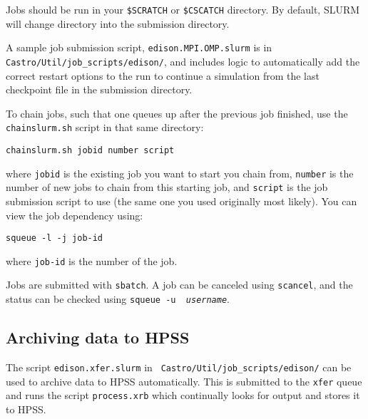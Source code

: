 Jobs should be run in your {\tt \$SCRATCH} or {\tt \$CSCATCH} directory.
By default, SLURM will change directory into the submission directory.

A sample job submission script, {\tt edison.MPI.OMP.slurm} is in {\tt
  Castro/Util/job\_scripts/edison/}, and includes logic to
automatically add the correct restart options to the run to continue a
simulation from the last checkpoint file in the submission directory.

To chain jobs, such that one queues up after the previous job finished,         
use the {\tt chainslurm.sh} script in that same directory:
\begin{verbatim}
chainslurm.sh jobid number script
\end{verbatim}
where {\tt jobid} is the existing job you want to start you chain
from, {\tt number} is the number of new jobs to chain from this
starting job, and {\tt script} is the job submission script to use
(the same one you used originally most likely).  You can view the job
dependency using:
\begin{verbatim}                                                                
squeue -l -j job-id                                                             
\end{verbatim}                                                                  
where {\tt job-id} is the number of the job.                                    
                                                                                
Jobs are submitted with {\tt sbatch}.  A job can be canceled using              
{\tt scancel}, and the status can be checked using {\tt squeue -u {\em          
username}}.                                                                     


\subsection{Archiving data to HPSS}

The script {\tt edison.xfer.slurm} in {\tt
  Castro/Util/job\_scripts/edison/} can be used to archive data to
HPSS automatically.  This is submitted to the {\tt xfer} queue and
runs the script {\tt process.xrb} which continually looks for output
and stores it to HPSS.

